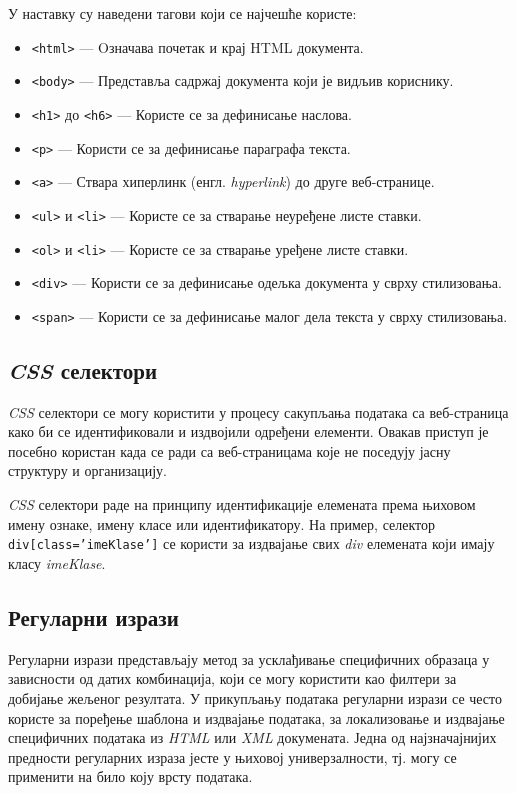 \documentclass[12pt,oneside]{memoir}
\begin{document}
У наставку су наведени тагови који се најчешће користе:
\begin{itemize}
    \item \texttt{<html>} --- Oзначава почетак и крај HTML документа.
    \item \texttt{<body>} --- Представља садржај документа који је видљив кориснику.
    \item \texttt{<h1>} до \texttt{<h6>} --- Користе се за дефинисање наслова.
    \item \texttt{<p>} --- Користи се за дефинисање параграфа текста.
    \item \texttt{<a>} --- Ствара хиперлинк (енгл. \textit{hyperlink}) до друге веб-странице.
    \item \texttt{<ul>} и \texttt{<li>} --- Користе се за стварање неуређене листе ставки.
    \item \texttt{<ol>} и \texttt{<li>} --- Користе се за стварање уређене листе ставки.
    \item \texttt{<div>} --- Користи се за дефинисање одељка документа у сврху стилизовања.
    \item \texttt{<span>} --- Користи се за дефинисање малог дела текста у сврху стилизовања.
\end{itemize}

\subsection{\textit{CSS} селектори}
\textit{CSS} селектори се могу користити у процесу сакупљања података са веб-страница како би се идентификовали и издвојили одређени елементи. Овакав приступ је посебно користан када се ради са веб-страницама које не поседују јасну структуру и организацију. 

\textit{CSS} селектори раде на принципу идентификације елемената према њиховом имену ознаке, имену класе или идентификатору. На пример, селектор  \texttt{div[class='imeKlase']} се користи за издвајање свих \textit{div} елемената који имају класу \textit{imeKlase}.

\subsection{Регуларни изрази}
Регуларни изрази представљају метод за усклађивање специфичних образаца у зависности од датих комбинација, који се могу користити као филтери за добијање жељеног резултата. У прикупљању података регуларни изрази се често користе за поређење шаблона и издвајање података, за локализовање и издвајање специфичних података из \textit{HTML} или \textit{XML} докумената. Једна од најзначајнијих предности регуларних израза јесте у њиховој универзалности, тј. могу се применити на било коју врсту података. 
\end{document}
